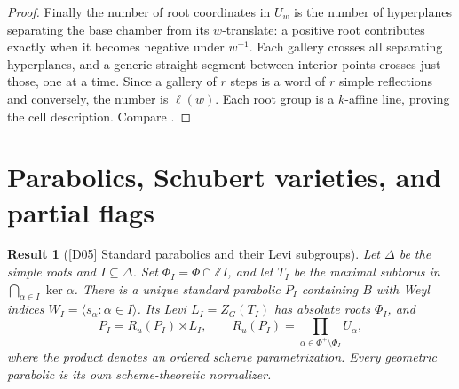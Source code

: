 \documentclass[11pt,a4paper,openany,oneside]{book}
\theoremstyle{resultstyle}
\newtheorem{statement}{Result}[chapter]
\newenvironment{result}[2]{\clubpenalty=10000\begin{statement}[\textnormal{[#1]} #2]\leavevmode\label{res:#1}\ignorespaces}{\end{statement}}
\theoremstyle{definition}
\numberwithin{equation}{chapter}
\newcommand{\ZZ}{\mathbb{Z}}
\begin{document}
\begin{proof}
Finally the number of root coordinates in \(U_w\) is the
number of hyperplanes separating the base chamber from its
\(w\)-translate: a positive root contributes exactly when it
becomes negative under \(w^{-1}\). Each gallery crosses all
separating hyperplanes, and a generic straight segment between
interior points crosses just those, one at a time. Since a
gallery of \(r\) steps is a word of \(r\) simple reflections
and conversely, the number is \(\ell(w)\).
Each root group is a \(k\)-affine line, proving the cell
description. Compare \cite[Proposition 10.3.3 and Appendix N.2]{conradfeng}.
\end{proof}

\section{Parabolics, Schubert varieties, and partial flags}

\begin{result}{D05}{Standard parabolics and their Levi subgroups}
Let \(\Delta\) be the simple roots and \(I\subseteq\Delta\). Set \(\Phi_I=\Phi\cap\ZZ I\), and let \(T_I\) be the maximal subtorus in \(\bigcap_{\alpha\in I}\ker\alpha\). There is a unique standard parabolic \(P_I\) containing \(B\) with Weyl indices \(W_I=\langle s_\alpha:\alpha\in I\rangle\). Its Levi \(L_I=Z_G(T_I)\) has absolute roots \(\Phi_I\), and
\[
    P_I = R_u(P_I)\rtimes L_I,\qquad
    R_u(P_I)=\prod_{\alpha\in\Phi^+\setminus\Phi_I} U_\alpha ,
\]
where the product denotes an ordered scheme parametrization. Every geometric parabolic is its own scheme-theoretic normalizer.
\end{result}
\end{document}
